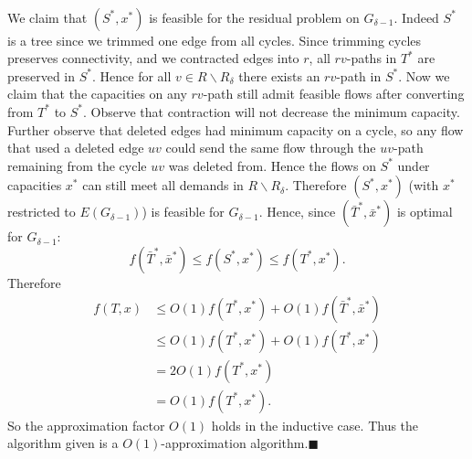 \documentclass[letterpaper,12pt,oneside,onecolumn]{article}
\begin{document}
\paragraph{}
We claim that $(S^*, x^*)$ is feasible for the residual problem on $G_{\delta-1}$. Indeed $S^*$ is a tree since we trimmed one edge from all cycles. Since trimming cycles preserves connectivity, and we contracted edges into $r$, all $rv$-paths in $T^*$ are preserved in $S^*$. Hence for all $v \in R\backslash R_\delta$ there exists an $rv$-path in $S^*$. Now we claim that the capacities on any $rv$-path still admit feasible flows after converting from $T^*$ to $S^*$. Observe that contraction will not decrease the minimum capacity. Further observe that deleted edges had minimum capacity on a cycle, so any flow that used a deleted edge $uv$ could send the same flow through the $uv$-path remaining from the cycle $uv$ was deleted from. Hence the flows on $S^*$ under capacities $x^*$ can still meet all demands in $R\backslash R_\delta$. Therefore $(S^*,x^*)$ (with $x^*$ restricted to $E(G_{\delta-1})$) is feasible for $G_{\delta -1}$. Hence, since $(\bar{T}^*, \bar{x}^*)$ is optimal for $G_{\delta -1}$:
$$f(\bar{T}^*, \bar{x}^*) \leq f(S^*, x^*) \leq f(T^*, x^*).$$
Therefore
\begin{align*}
f(T,x) &\leq O(1)f(T^*,x^*) + O(1)f(\bar{T}^*,\bar{x}^*) \\
&\leq O(1)f(T^*,x^*) + O(1)f(T^*,x^*) \\
&= 2O(1)f(T^*,x^*)\\
&= O(1)f(T^*,x^*).
\end{align*}
So the approximation factor $O(1)$ holds in the inductive case. Thus the algorithm given is a $O(1)$-approximation algorithm.$\blacksquare$
\end{document}
